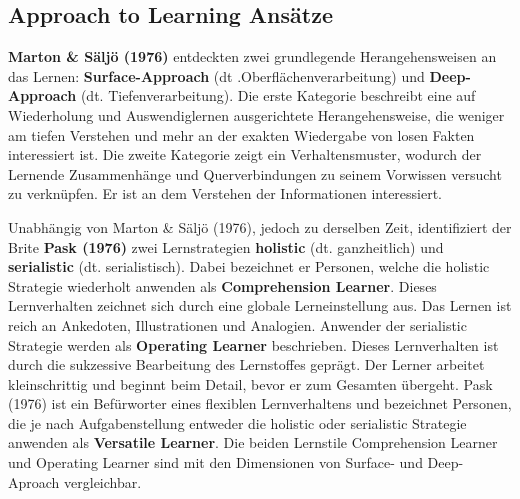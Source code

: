         \subsection{Approach to Learning Ansätze} \label{ATL}
        \textbf{Marton \& Säljö (1976)} entdeckten zwei grundlegende Herangehensweisen an das Lernen: \textbf{\glqq Surface-Approach\grqq{} } (dt .Oberflächenverarbeitung) und 
        \textbf{\glqq Deep-Approach\grqq{} } (dt. Tiefenverarbeitung). \nocite{Marton.1984}
        Die erste Kategorie beschreibt eine auf Wiederholung und Auswendiglernen ausgerichtete Herangehensweise, die  weniger am tiefen Verstehen und mehr an der exakten Wiedergabe von losen Fakten interessiert ist.
        Die zweite Kategorie zeigt ein Verhaltensmuster, wodurch der Lernende Zusammenhänge und Querverbindungen zu seinem Vorwissen versucht zu verknüpfen. Er ist an dem Verstehen der Informationen interessiert. \parencite[8 f.]{Martin.2012}\parencite[366]{Cress.2006}\parencite[145 f.]{Looss.2007}
        
        Unabhängig von Marton \& Säljö (1976), jedoch zu derselben Zeit, identifiziert der Brite \textbf{Pask (1976)} zwei Lernstrategien \textbf{\glqq holistic\grqq{}} (dt. ganzheitlich) und \textbf{\glqq serialistic\grqq{}} (dt. serialistisch). Dabei bezeichnet er Personen, welche die holistic Strategie wiederholt anwenden als \textbf{\glqq Comprehension Learner\grqq{}}. 
        Dieses Lernverhalten zeichnet sich durch eine globale Lerneinstellung aus. Das Lernen ist reich an Ankedoten, Illustrationen und Analogien.
        Anwender der serialistic Strategie werden als \textbf{\glqq Operating Learner\grqq{}} beschrieben. Dieses Lernverhalten ist durch die sukzessive Bearbeitung des Lernstoffes geprägt. Der Lerner arbeitet kleinschrittig und 
        beginnt beim Detail, bevor er zum Gesamten übergeht. Pask
        (1976) ist ein Befürworter eines flexiblen Lernverhaltens und bezeichnet Personen, die
        je nach Aufgabenstellung entweder die holistic oder serialistic Strategie anwenden als
        \textbf{\glqq Versatile Learner\grqq{}}.
        Die beiden Lernstile Comprehension Learner und Operating Learner sind mit den Dimensionen von Surface- und Deep-Aproach vergleichbar.
        \parencite[9]{Martin.2012}\parencite[369]{Cress.2006}\parencite[12 f.]{Thielke.2003} 

